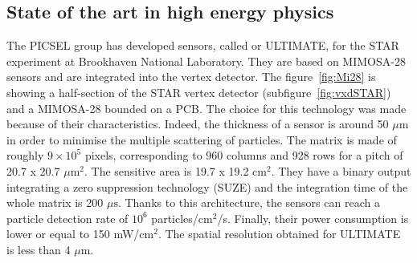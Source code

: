     \subsection{State of the art in high energy physics}
    \label{subsec:Mi26}

    The PICSEL group has developed sensors, called or ULTIMATE, for the STAR experiment at Brookhaven National Laboratory.
    They are based on \gls{MIMOSA}-28 sensors and are integrated into the vertex detector.
    The figure~\ref{fig:Mi28} is showing a half-section of the STAR vertex detector (subfigure~\ref{fig:vxdSTAR}) and a \gls{MIMOSA}-28 bounded on a PCB.
    The choice for this technology was made because of their characteristics.
    Indeed, the thickness of a sensor is around 50 $\mu\text{m}$ in order to minimise the multiple scattering of particles.
    The matrix is made of roughly $9 \times 10^5$ pixels, corresponding to 960 columns and 928 rows for a pitch of 20.7 x 20.7 $\mu\text{m}^2$.
    The sensitive area is 19.7 x 19.2 $\text{cm}^2$.
    They have a binary output integrating a zero suppression technology (SUZE) and the integration time of the whole matrix is 200 $\mu\text{s}$.
    Thanks to this architecture, the sensors can reach a particle detection rate of $10^6$ particles/$\text{cm}^2$/s. 
    Finally, their power consumption is lower or equal to 150 mW/$\text{cm}^2$.
    The spatial resolution obtained for ULTIMATE is less than 4 $\mu\text{m}$.

